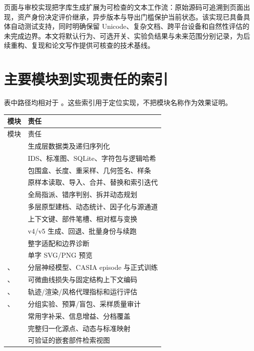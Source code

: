\documentclass[UTF8,a4paper,11pt,fontset=fandol]{ctexart}
\begin{document}
页面与审校实现把字库生成扩展为可检查的文本工作流：原始源码可追溯到页面出现，资产身份决定评价继承，异步版本与导出门槛保护当前状态。该实现已具备具体自动测试支持，同时明确保留 Unicode、复杂文档、跨平台设备和自然性评估的未完成边界。本文将默认行为、可选开关、实验负结果与未来范围分别记录，为后续重构、复现和论文写作提供可核查的技术基线。

\appendix
\section{主要模块到实现责任的索引}
表中路径均相对于 。这些索引用于定位实现，不把模块名称作为效果证明。
\begin{longtable}{L{64mm}L{80mm}}
\toprule 模块 & 责任\\\midrule\endfirsthead
\toprule 模块 & 责任\\\midrule\endhead
{} & 生成层数据类及递归序列化\\
 & IDS、标准图、SQLite、字符包与逻辑哈希\\
 & 包围盒、长度、重采样、几何签名、样条\\
 & 原样本读取、导入、合并、替换和索引迭代\\
 & 全局指派、错序判别、拆并动态规划\\
 & 多层原型建档、动态统计、因子化与源通道\\
 & 上下文键、部件笔槽、相对框与变换\\
 & v4/v5 生成、回退、批量身份与续跑\\
 & 整字适配和边界诊断\\
 & 单字 SVG/PNG 预览\\
、 & 分层神经模型、CASIA episode 与正式训练\\
、 & 可微曲线损失与固定结构上下文编码\\
、 & 轨迹/渲染/风格代理指标和运行评估\\
、 & 分组实验、预算/盲包、采样质量审计\\
 & 常用字补采、信息增益、分档覆盖\\
 & 完整归一化源点、动态与标准映射\\
 & 可验证的嵌套部件检索视图\\

\end{longtable}
\end{document}

